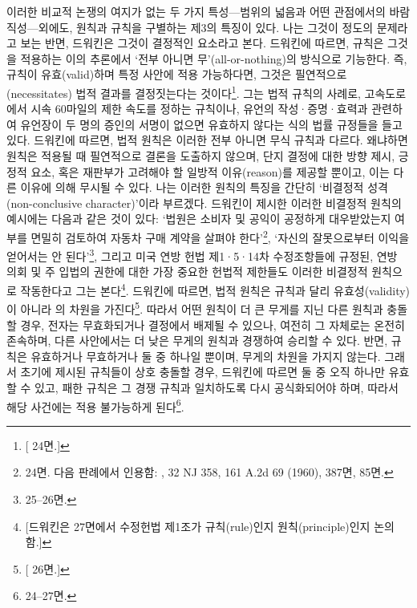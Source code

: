 이러한 비교적 논쟁의 여지가 없는 두 가지 특성---범위의 넓음과 어떤
관점에서의 바람직성---외에도, 원칙과 규칙을 구별하는 제3의 특징이 있다.
나는 그것이 정도의 문제라고 보는 반면, 드워킨은 그것이 결정적인 요소라고
본다. 드워킨에 따르면, 규칙은 그것을 적용하는 이의 추론에서 `전부 아니면
무'(all-or-nothing)의 방식으로 기능한다. 즉, 규칙이 유효(valid)하며 특정
사안에 적용 가능하다면, 그것은 필연적으로(necessitates) 법적 결과를
결정짓는다는 것이다\footnote{{[} 24면.{]}}. 그는 법적 규칙의
사례로, 고속도로에서 시속 60마일의 제한 속도를 정하는 규칙이나, 유언의
작성·증명·효력과 관련하여 유언장이 두 명의 증인의 서명이 없으면 유효하지
않다는 식의 법률 규정들을 들고 있다. 드워킨에 따르면, 법적 원칙은 이러한
전부 아니면 무식 규칙과 다르다. 왜냐하면 원칙은 적용될 때 필연적으로
결론을 도출하지 않으며, 단지 결정에 대한 방향 제시, 긍정적 요소, 혹은
재판부가 고려해야 할 일방적 이유(reason)를 제공할 뿐이고, 이는 다른
이유에 의해 무시될 수 있다. 나는 이러한 원칙의 특징을 간단히 `비결정적
성격(non-conclusive character)'이라 부르겠다. 드워킨이 제시한 이러한
비결정적 원칙의 예시에는 다음과 같은 것이 있다: `법원은 소비자 및 공익이
공정하게 대우받았는지 여부를 면밀히 검토하여 자동차 구매 계약을 살펴야
한다'\footnote{ 24면. 다음 판례에서 인용함: , 32 NJ 358, 161 A.2d 69 (1960), 387면,
  85면.}, `자신의 잘못으로부터 이익을 얻어서는 안 된다'\footnote{
  25--26면.}, 그리고 미국 연방 헌법 제1·5·14차 수정조항들에 규정된, 연방
의회 및 주 입법의 권한에 대한 가장 중요한 헌법적 제한들도 이러한
비결정적 원칙으로 작동한다고 그는 본다\footnote{{[}드워킨은 
  27면에서 수정헌법 제1조가 규칙(rule)인지 원칙(principle)인지
  논의함.{]}}. 드워킨에 따르면, 법적 원칙은 규칙과 달리
유효성(validity)이 아니라 의 차원을
가진다\footnote{{[} 26면.{]}}. 따라서 어떤 원칙이 더 큰 무게를
지닌 다른 원칙과 충돌할 경우, 전자는 무효화되거나 결정에서 배제될 수
있으나, 여전히 그 자체로는 온전히 존속하며, 다른 사안에서는 더 낮은
무게의 원칙과 경쟁하여 승리할 수 있다. 반면, 규칙은 유효하거나
무효하거나 둘 중 하나일 뿐이며, 무게의 차원을 가지지 않는다. 그래서
초기에 제시된 규칙들이 상호 충돌할 경우, 드워킨에 따르면 둘 중 오직
하나만 유효할 수 있고, 패한 규칙은 그 경쟁 규칙과 일치하도록 다시
공식화되어야 하며, 따라서 해당 사건에는 적용 불가능하게 된다\footnote{
  24--27면.}.

